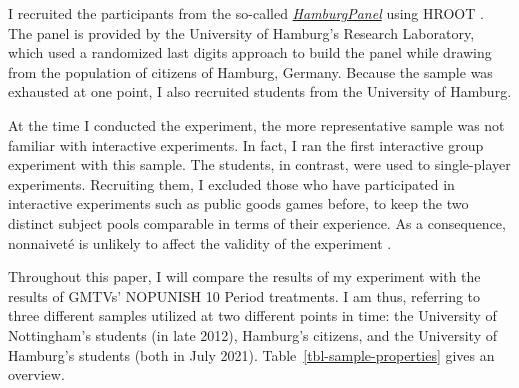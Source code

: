 \documentclass[
  authoryear,
  review,
  3p,
  onecolumn]{elsarticle}
\begin{document}
I recruited the participants from the so-called
\emph{\href{https://www.wiso.uni-hamburg.de/forschung/forschungslabor/umfragelabor/aktuelle-umfragen/hamburgpanel.html}{HamburgPanel}}
using HROOT \citep{hroot}. The panel is provided by the University of
Hamburg's Research Laboratory, which used a randomized last digits
approach to build the panel while drawing from the population of
citizens of Hamburg, Germany. Because the sample was exhausted at one
point, I also recruited students from the University of Hamburg.

At the time I conducted the experiment, the more representative sample
was not familiar with interactive experiments. In fact, I ran the first
interactive group experiment with this sample. The students, in
contrast, were used to single-player experiments. Recruiting them, I
excluded those who have participated in interactive experiments such as
public goods games before, to keep the two distinct subject pools
comparable in terms of their experience. As a consequence, nonnaiveté is
unlikely to affect the validity of the experiment \citep[
p.~204]{GoodmanPaolacci2017}.

Throughout this paper, I will compare the results of my experiment with
the results of GMTVs' NOPUNISH 10 Period treatments. I am thus,
referring to three different samples utilized at two different points in
time: the University of Nottingham's students (in late 2012), Hamburg's
citizens, and the University of Hamburg's students (both in July 2021).
Table~\ref{tbl-sample-properties} gives an overview.

\hypertarget{tbl-sample-properties}{}
\begin{table}[!htbp] \centering \renewcommand*{\arraystretch}{1.1}\caption{\label{tbl-sample-properties}Sample Properties }
\end{table}
\end{document}
